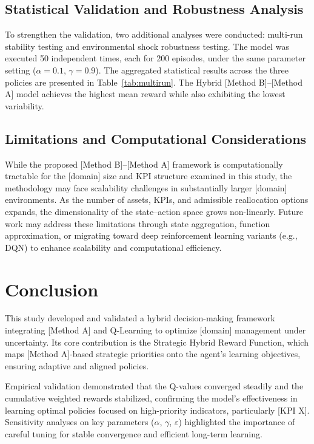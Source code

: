 \documentclass[10pt,twocolumn]{article}
\begin{document}
\subsection{Statistical Validation and Robustness Analysis}

To strengthen the validation, two additional analyses were
conducted: multi-run stability testing and environmental shock
robustness testing. The model was executed 50 independent times,
each for 200 episodes, under the same parameter setting
($\alpha=0.1$, $\gamma=0.9$). The aggregated statistical results
across the three policies are presented in
Table~\ref{tab:multirun}. The Hybrid [Method B]--[Method A] model
achieves the highest mean reward while also exhibiting the lowest
variability.

\subsection{Limitations and Computational Considerations}

While the proposed [Method B]--[Method A] framework is
computationally tractable for the [domain] size and KPI structure
examined in this study, the methodology may face scalability
challenges in substantially larger [domain] environments. As the
number of assets, KPIs, and admissible reallocation options
expands, the dimensionality of the state--action space grows
non-linearly. Future work may address these limitations through
state aggregation, function approximation, or migrating toward deep
reinforcement learning variants (e.g., DQN) to enhance scalability
and computational efficiency.

\section{Conclusion}

This study developed and validated a hybrid decision-making
framework integrating [Method A] and Q-Learning to optimize
[domain] management under uncertainty. Its core contribution is the
Strategic Hybrid Reward Function, which maps [Method A]-based
strategic priorities onto the agent's learning objectives, ensuring
adaptive and aligned policies.

Empirical validation demonstrated that the Q-values converged
steadily and the cumulative weighted rewards stabilized, confirming
the model's effectiveness in learning optimal policies focused on
high-priority indicators, particularly [KPI X]. Sensitivity
analyses on key parameters ($\alpha$, $\gamma$, $\varepsilon$)
highlighted the importance of careful tuning for stable convergence
and efficient long-term learning.
\end{document}
